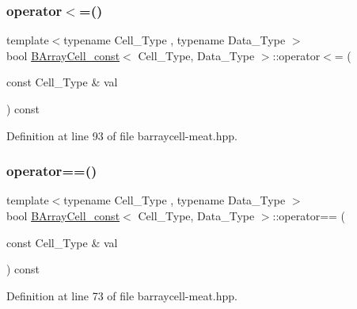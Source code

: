 \mbox{\label{class_b_array_cell__const_a4221856ab5a0b1e149a99e776eee4614}} 
\subsubsection{\texorpdfstring{operator$<$=()}{operator<=()}}
{\footnotesize\ttfamily template$<$typename Cell\+\_\+\+Type , typename Data\+\_\+\+Type $>$ \\
bool \hyperlink{class_b_array_cell__const}{B\+Array\+Cell\+\_\+const}$<$ Cell\+\_\+\+Type, Data\+\_\+\+Type $>$\+::operator$<$= (\begin{DoxyParamCaption}\item[{const Cell\+\_\+\+Type \&}]{val }\end{DoxyParamCaption}) const\hspace{0.3cm}{\ttfamily [inline]}}



Definition at line 93 of file barraycell-\/meat.\+hpp.

\mbox{\label{class_b_array_cell__const_a267ac042fc28e411ca553f6f61cbe9b3}} 
\subsubsection{\texorpdfstring{operator==()}{operator==()}}
{\footnotesize\ttfamily template$<$typename Cell\+\_\+\+Type , typename Data\+\_\+\+Type $>$ \\
bool \hyperlink{class_b_array_cell__const}{B\+Array\+Cell\+\_\+const}$<$ Cell\+\_\+\+Type, Data\+\_\+\+Type $>$\+::operator== (\begin{DoxyParamCaption}\item[{const Cell\+\_\+\+Type \&}]{val }\end{DoxyParamCaption}) const\hspace{0.3cm}{\ttfamily [inline]}}



Definition at line 73 of file barraycell-\/meat.\+hpp.

\mbox{\label{class_b_array_cell__const_a2cf1300cf2b4670fe735e718482f5791}} 
